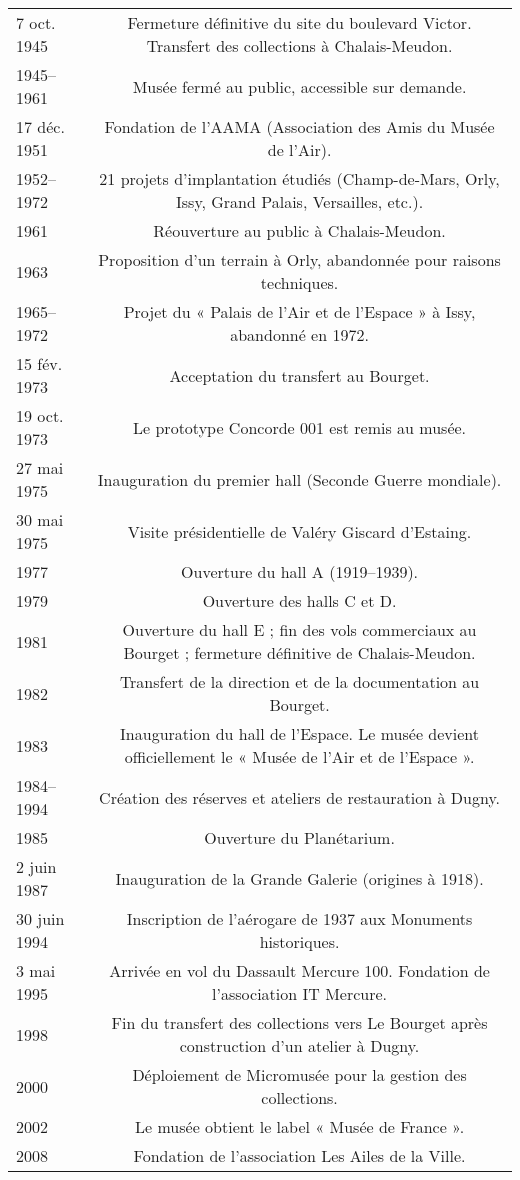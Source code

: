 \begin{longtable}{B C}
 7 oct. 1945 & Fermeture définitive du site du boulevard Victor. Transfert des collections à Chalais-Meudon. \\
 1945--1961 & Musée fermé au public, accessible sur demande. \\
 17 déc. 1951 & Fondation de l’AAMA (Association des Amis du Musée de l’Air). \\
 1952--1972 & 21 projets d’implantation étudiés (Champ-de-Mars, Orly, Issy, Grand Palais, Versailles, etc.). \\
 1961 & Réouverture au public à Chalais-Meudon. \\
 1963 & Proposition d’un terrain à Orly, abandonnée pour raisons techniques. \\
 1965--1972 & Projet du « Palais de l’Air et de l’Espace » à Issy, abandonné en 1972. \\

15 fév. 1973 & Acceptation du transfert au Bourget. \\
19 oct. 1973 & Le prototype Concorde 001 est remis au musée. \\
27 mai 1975 & Inauguration du premier hall (Seconde Guerre mondiale). \\
30 mai 1975 & Visite présidentielle de Valéry Giscard d’Estaing. \\
1977 & Ouverture du hall A (1919--1939). \\
1979 & Ouverture des halls C et D. \\
1981 & Ouverture du hall E ; fin des vols commerciaux au Bourget ; fermeture   définitive de Chalais-Meudon. \\
1982 & Transfert de la direction et de la documentation au Bourget. \\

1983 & Inauguration du hall de l’Espace. Le musée devient officiellement le « Musée de l’Air et de l’Espace ». \\
 1984--1994 & Création des réserves et ateliers de restauration à Dugny. \\
 1985 & Ouverture du Planétarium. \\
 2 juin 1987 & Inauguration de la Grande Galerie (origines à 1918). \\
 30 juin 1994 & Inscription de l’aérogare de 1937 aux Monuments historiques. \\
 3 mai 1995 & Arrivée en vol du Dassault Mercure 100. Fondation de l’association IT Mercure. \\
 1998 & Fin du transfert des collections vers Le Bourget après construction d’un atelier à Dugny. \\
 2000 & Déploiement de Micromusée pour la gestion des collections. \\
 2002 & Le musée obtient le label « Musée de France ». \\
 2008 & Fondation de l’association Les Ailes de la Ville. \\



\end{longtable}
